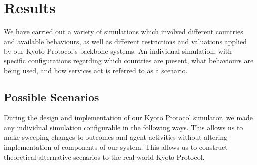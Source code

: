 \section{Results}

We have carried out a variety of simulations which involved different countries and available behaviours, as well as different restrictions and valuations applied by our Kyoto Protocol's backbone systems. An individual simulation, with specific configurations regarding which countries are present, what behaviours are being used, and how services act is referred to as a scenario.

\subsection{Possible Scenarios}

During the design and implementation of our Kyoto Protocol simulator, we made any individual simulation configurable in the following ways. This allows us to make sweeping changes to outcomes and agent activities without altering implementation of components of our system. This allows us to construct theoretical alternative scenarios to the real world Kyoto Protocol.

